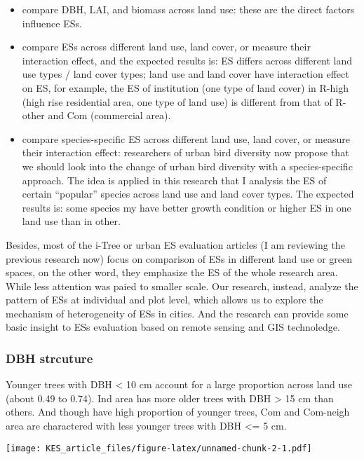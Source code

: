 \documentclass[
]{article}
\begin{document}
\begin{itemize}
\item
  compare DBH, LAI, and biomass across land use: these are the direct factors influence ESs.
\item
  compare ESs across different land use, land cover, or measure their interaction effect, and the expected results is: ES differs across different land use types / land cover types; land use and land cover have interaction effect on ES, for example, the ES of institution (one type of land cover) in R-high (high rise residential area, one type of land use) is different from that of R-other and Com (commercial area).
\item
  compare species-specific ES across different land use, land cover, or measure their interaction effect: researchers of urban bird diversity now propose that we should look into the change of urban bird diversity with a species-specific approach. The idea is applied in this research that I analysis the ES of certain ``popular'' species across land use and land cover types. The expected results is: some species my have better growth condition or higher ES in one land use than in other.
\end{itemize}

Besides, most of the i-Tree or urban ES evaluation articles (I am reviewing the previous research now) focus on comparison of ESs in different land use or green spaces, on the other word, they emphasize the ES of the whole research area. While less attention was paied to smaller scale. Our research, instead, analyze the pattern of ESs at individual and plot level, which allows us to explore the mechanism of heterogeneity of ESs in cities. And the research can provide some basic insight to ESs evaluation based on remote sensing and GIS technoledge.

\hypertarget{dbh-strcuture}{%
\subsubsection{DBH strcuture}\label{dbh-strcuture}}

Younger trees with DBH \textless{} 10 cm account for a large proportion across land use (about 0.49 to 0.74). Ind area has more older trees with DBH \textgreater{} 15 cm than others. And though have high proportion of younger trees, Com and Com-neigh area are charactered with less younger trees with DBH \textless= 5 cm.

\texttt{[image: KES\_article\_files/figure-latex/unnamed-chunk-2-1.pdf]}
\end{document}
